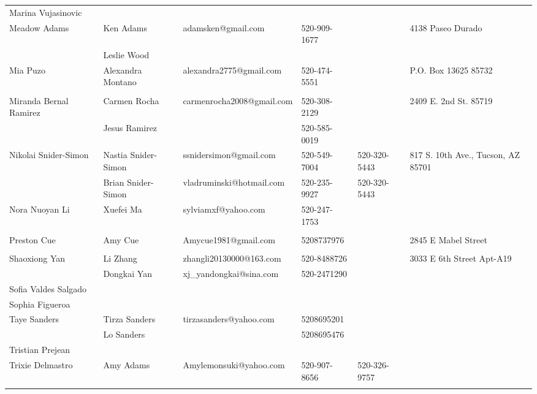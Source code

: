 \documentclass[landscape]{article}\usepackage[]{graphicx}\usepackage[]{color}
\begin{document}
\begin{longtable}{|p{100pt}|p{100pt}|p{140pt}|p{60pt}|p{64pt}|p{120pt}|}
\hline
\multirow{2}{100pt}{Marina Vujasinovic} &  &  &  &  & \multirow{2}{120pt}{} \\
 &  &  &  &  & \\
\hline
\multirow{2}{100pt}{Meadow Adams} & Ken Adams & adamsken@gmail.com & 520-909-1677 &  & \multirow{2}{120pt}{4138 Paseo Durado} \\
 & Leslie Wood &  &  &  & \\
\hline
\multirow{2}{100pt}{Mia Puzo} & Alexandra Montano & alexandra2775@gmail.com & 520-474-5551 &  & \multirow{2}{120pt}{P.O. Box 13625    85732} \\
 &  &  &  &  & \\
\hline
\multirow{2}{100pt}{Miranda Bernal Ramirez} & Carmen Rocha & carmenrocha2008@gmail.com & 520-308-2129 &  & \multirow{2}{120pt}{2409 E. 2nd St. 85719} \\
 & Jesus Ramirez &  & 520-585-0019 &  & \\
\hline
\multirow{2}{100pt}{Nikolai Snider-Simon} & Nastia Snider-Simon & ssnidersimon@gmail.com & 520-549-7004 & 520-320-5443 & \multirow{2}{120pt}{817 S. 10th Ave., Tucson, AZ 85701} \\
 & Brian Snider-Simon & vladruminski@hotmail.com & 520-235-9927 & 520-320-5443 & \\
\hline
\multirow{2}{100pt}{Nora Nuoyan Li} & Xuefei Ma & sylviamxf@yahoo.com & 520-247-1753 &  & \multirow{2}{120pt}{} \\
 &  &  &  &  & \\
\hline
\multirow{2}{100pt}{Preston Cue} & Amy Cue & Amycue1981@gmail.com & 5208737976 &  & \multirow{2}{120pt}{2845 E Mabel Street } \\
 &  &  &  &  & \\
\hline
\multirow{2}{100pt}{Shaoxiong Yan} & Li Zhang & zhangli20130000@163.com & 520-8488726 &  & \multirow{2}{120pt}{3033 E 6th Street Apt-A19} \\
 & Dongkai Yan & xj\_yandongkai@sina.com & 520-2471290 &  & \\
\hline
\multirow{2}{100pt}{Sofia Valdes Salgado} &  &  &  &  & \multirow{2}{120pt}{} \\
 &  &  &  &  & \\
\hline
\multirow{2}{100pt}{Sophia Figueroa} &  &  &  &  & \multirow{2}{120pt}{} \\
 &  &  &  &  & \\
\hline
\multirow{2}{100pt}{Taye Sanders} & Tirza Sanders & tirzasanders@yahoo.com & 5208695201 &  & \multirow{2}{120pt}{} \\
 & Lo Sanders &  & 5208695476 &  & \\
\hline
\multirow{2}{100pt}{Tristian Prejean} &  &  &  &  & \multirow{2}{120pt}{} \\
 &  &  &  &  & \\
\hline
\multirow{2}{100pt}{Trixie Delmastro} & Amy Adams & Amylemonsuki@yahoo.com & 520-907-8656 & 520-326-9757 & \multirow{2}{120pt}{} \\
 &  &  &  &  & \\
\hline
\end{longtable}
\newpage
\end{document}
